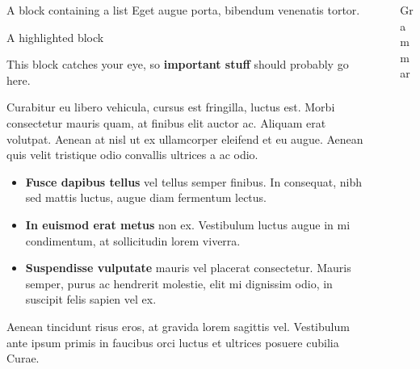 \documentclass[final]{beamer}
\newlength{\sepwidth}
\newlength{\colwidth}
\newcommand{\separatorcolumn}{\begin{column}{\sepwidth}\end{column}}
\begin{document}
\begin{frame}[t]
\begin{columns}[t]
\begin{column}{\colwidth}
\begin{block}{A block containing a list}
    Eget augue porta, bibendum venenatis tortor.

  \end{block}

  \begin{alertblock}{A highlighted block}

    This block catches your eye, so \textbf{important stuff} should probably go
    here.

    Curabitur eu libero vehicula, cursus est fringilla, luctus est. Morbi
    consectetur mauris quam, at finibus elit auctor ac. Aliquam erat volutpat.
    Aenean at nisl ut ex ullamcorper eleifend et eu augue. Aenean quis velit
    tristique odio convallis ultrices a ac odio.

    \begin{itemize}
      \item \textbf{Fusce dapibus tellus} vel tellus semper finibus. In
        consequat, nibh sed mattis luctus, augue diam fermentum lectus.
      \item \textbf{In euismod erat metus} non ex. Vestibulum luctus augue in
        mi condimentum, at sollicitudin lorem viverra.
      \item \textbf{Suspendisse vulputate} mauris vel placerat consectetur.
        Mauris semper, purus ac hendrerit molestie, elit mi dignissim odio, in
        suscipit felis sapien vel ex.
    \end{itemize}

    Aenean tincidunt risus eros, at gravida lorem sagittis vel. Vestibulum ante
    ipsum primis in faucibus orci luctus et ultrices posuere cubilia Curae.

  \end{alertblock}

\end{column}

\separatorcolumn

\begin{column}{\colwidth}

  \begin{block}{Grammar}
    \small
    \centering


\end{block}
\end{column}
\end{columns}
\end{frame}
\end{document}
